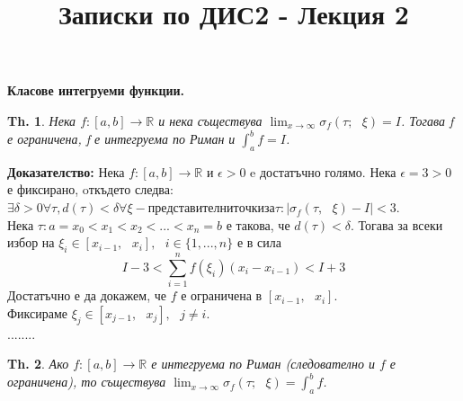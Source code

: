 \documentclass[12pt]{article}
\newtheorem{theorem}{Th.}
\newcommand{\spc}{\text{ }}
\begin{document}
	\color{white}
	\pagecolor{darkgray}
	\title{Записки по ДИС2 - Лекция 2}
	\maketitle
	\begin{center}
		\Large
		\textbf{Класове интегруеми функции. }
	\end{center}

	\begin{theorem}
		Нека $f: \left[a, b\right] \rightarrow \mathbb{R}$ и нека съществува  $\lim_{x\to\infty} \sigma_{f}\left(\tau;\spc\xi\right) = I$. Тогава f е ограничена, f е интегруема по Риман и $\int_{a}^{b} f = I$.
		
	\end{theorem}
	\textbf{Доказателство:} Нека $f: \left[a, b\right] \rightarrow \mathbb{R}$ и $\epsilon > 0$ e достатъчно голямо. Нека $\epsilon = 3 > 0$ е фиксирано, oткъдето следва: \\
	$\exists\delta>0\forall\tau, d(\tau)<\delta\forall\xi - представителни точки за \tau : |\sigma_{f}\left(\tau,\spc\xi\right)-I|<3$.\\
	Нека $\tau : a=x_{0}<x_{1}<x_{2}<...<x_{n}=b$ е такова, че $d(\tau)<\delta$.
	Тогава за всеки избор на $\xi_{i}\in\left[x_{i-1},\spc x_{i}\right],\spc i\in\{1,...,n\}$ е в сила\\
	\[I-3 < \sum _{i=1}^{n}f(\xi_{i})(x_{i}-x_{i-1})<I+3\]
	Достатъчно е да докажем, че $f$ е ограничена в $\left[x_{i-1},\spc x_{i}\right]$.\\
	Фиксираме $\xi_{j}\in\left[x_{j-1},\spc x_{j}\right],\spc j\neq i$.\\
	........
	
	\begin{theorem}
		Ако $f: \left[a, b\right] \rightarrow \mathbb{R}$ е интегруема по Риман (следователно и $f$ е ограничена), то съществува $\lim_{x\to\infty} \sigma_{f}\left(\tau;\spc\xi\right) = \int_{a}^{b} f$.
		
	\end{theorem}
\end{document}
